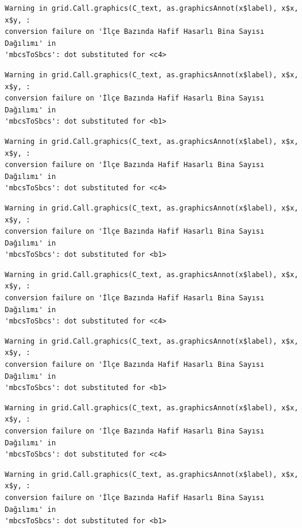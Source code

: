 \documentclass[
  11pt,
  a4paper,
  DIV=11,
  numbers=noendperiod]{scrartcl}
\begin{document}
\begin{verbatim}
Warning in grid.Call.graphics(C_text, as.graphicsAnnot(x$label), x$x, x$y, :
conversion failure on 'İlçe Bazında Hafif Hasarlı Bina Sayısı Dağılımı' in
'mbcsToSbcs': dot substituted for <c4>
\end{verbatim}

\begin{verbatim}
Warning in grid.Call.graphics(C_text, as.graphicsAnnot(x$label), x$x, x$y, :
conversion failure on 'İlçe Bazında Hafif Hasarlı Bina Sayısı Dağılımı' in
'mbcsToSbcs': dot substituted for <b1>
\end{verbatim}

\begin{verbatim}
Warning in grid.Call.graphics(C_text, as.graphicsAnnot(x$label), x$x, x$y, :
conversion failure on 'İlçe Bazında Hafif Hasarlı Bina Sayısı Dağılımı' in
'mbcsToSbcs': dot substituted for <c4>
\end{verbatim}

\begin{verbatim}
Warning in grid.Call.graphics(C_text, as.graphicsAnnot(x$label), x$x, x$y, :
conversion failure on 'İlçe Bazında Hafif Hasarlı Bina Sayısı Dağılımı' in
'mbcsToSbcs': dot substituted for <b1>
\end{verbatim}

\begin{verbatim}
Warning in grid.Call.graphics(C_text, as.graphicsAnnot(x$label), x$x, x$y, :
conversion failure on 'İlçe Bazında Hafif Hasarlı Bina Sayısı Dağılımı' in
'mbcsToSbcs': dot substituted for <c4>
\end{verbatim}

\begin{verbatim}
Warning in grid.Call.graphics(C_text, as.graphicsAnnot(x$label), x$x, x$y, :
conversion failure on 'İlçe Bazında Hafif Hasarlı Bina Sayısı Dağılımı' in
'mbcsToSbcs': dot substituted for <b1>
\end{verbatim}

\begin{verbatim}
Warning in grid.Call.graphics(C_text, as.graphicsAnnot(x$label), x$x, x$y, :
conversion failure on 'İlçe Bazında Hafif Hasarlı Bina Sayısı Dağılımı' in
'mbcsToSbcs': dot substituted for <c4>
\end{verbatim}

\begin{verbatim}
Warning in grid.Call.graphics(C_text, as.graphicsAnnot(x$label), x$x, x$y, :
conversion failure on 'İlçe Bazında Hafif Hasarlı Bina Sayısı Dağılımı' in
'mbcsToSbcs': dot substituted for <b1>
\end{verbatim}
\end{document}
